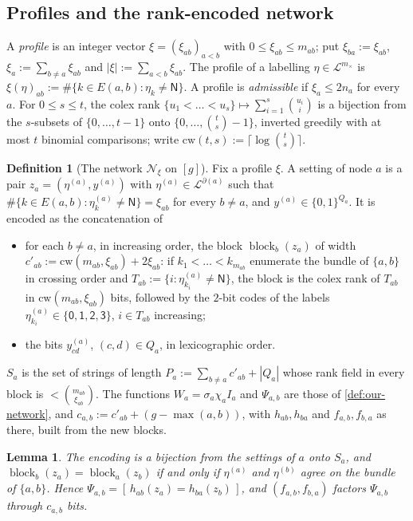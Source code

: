 \documentclass[11pt]{amsart}
\theoremstyle{plain}
\newtheorem{lemma}[theorem]{Lemma}
\theoremstyle{definition}
\newtheorem{definition}[theorem]{Definition}
\theoremstyle{remark}
\numberwithin{equation}{section}
\newcommand{\cL}{\mathcal{L}}
\newcommand{\lab}[1]{\mathsf{#1}}
\newcommand{\mx}{m_{\times}}
\newcommand{\block}{\operatorname{block}}
\newcommand{\Ind}[1]{[\,#1\,]}
\begin{document}
\subsection{Profiles and the rank-encoded network}
A \emph{profile} is an integer vector $\xi=(\xi_{ab})_{a<b}$ with $0\le\xi_{ab}\le m_{ab}$; put
$\xi_{ba}:=\xi_{ab}$, $\xi_a:=\sum_{b\ne a}\xi_{ab}$ and $|\xi|:=\sum_{a<b}\xi_{ab}$. The profile of
a labelling $\eta\in\cL^{\mx}$ is $\xi(\eta)_{ab}:=\#\{k\in E(a,b):\eta_k\ne\lab N\}$. A profile is
\emph{admissible} if $\xi_a\le2n_a$ for every $a$. For $0\le s\le t$, the colex rank
$\{u_1<\dots<u_s\}\mapsto\sum_{i=1}^s\binom{u_i}{i}$ is a bijection from the $s$-subsets of
$\{0,\dots,t-1\}$ onto $\{0,\dots,\binom ts-1\}$, inverted greedily with at most $t$ binomial
comparisons; write $\mathrm{cw}(t,s):=\lceil\log\binom ts\rceil$.

\begin{definition}[{The network $\mathcal N_\xi$ on $[g]$}]\label{def:rank-network}
Fix a profile $\xi$. A setting of node $a$ is a pair $z_a=(\eta^{(a)},y^{(a)})$ with
$\eta^{(a)}\in\cL^{\partial(a)}$ such that $\#\{k\in E(a,b):\eta^{(a)}_k\ne\lab N\}=\xi_{ab}$ for every
$b\ne a$, and $y^{(a)}\in\{0,1\}^{Q_a}$. It is encoded as the concatenation of
\begin{itemize}
\item for each $b\ne a$, in increasing order, the block $\block_b(z_a)$ of width
$c'_{ab}:=\mathrm{cw}(m_{ab},\xi_{ab})+2\xi_{ab}$: if $k_1<\dots<k_{m_{ab}}$ enumerate the bundle of
$\{a,b\}$ in crossing order and $T_{ab}:=\{i:\eta^{(a)}_{k_i}\ne\lab N\}$, the block is the colex
rank of $T_{ab}$ in $\mathrm{cw}(m_{ab},\xi_{ab})$ bits, followed by the $2$-bit codes of the labels
$\eta^{(a)}_{k_i}\in\{\lab0,\lab1,\lab2,\lab3\}$, $i\in T_{ab}$ increasing;
\item the bits $y^{(a)}_{cd}$, $(c,d)\in Q_a$, in lexicographic order.
\end{itemize}
$S_a$ is the set of strings of length $P_a:=\sum_{b\ne a}c'_{ab}+|Q_a|$ whose rank field in every
block is $<\binom{m_{ab}}{\xi_{ab}}$. The functions $W_a=\sigma_a\chi_aI_a$ and $\Psi_{a,b}$ are those
of \cref{def:our-network}, and $c_{a,b}:=c'_{ab}+(g-\max(a,b))$, with $h_{ab},h_{ba}$ and $f_{a,b},
f_{b,a}$ as there, built from the new blocks.
\end{definition}

\begin{lemma}\label{lem:rank-encoding}
The encoding is a bijection from the settings of $a$ onto $S_a$, and $\block_b(z_a)=\block_a(z_b)$
if and only if $\eta^{(a)}$ and $\eta^{(b)}$ agree on the bundle of $\{a,b\}$. Hence
$\Psi_{a,b}=\Ind{h_{ab}(z_a)=h_{ba}(z_b)}$, and $(f_{a,b},f_{b,a})$ factors $\Psi_{a,b}$ through
$c_{a,b}$ bits.
\end{lemma}
\end{document}
